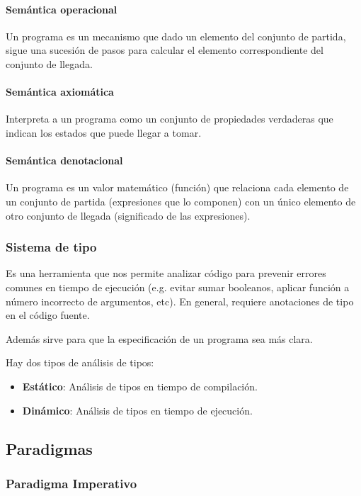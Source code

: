 \paragraph{Semántica operacional} Un programa es un mecanismo que dado un elemento del conjunto de partida, sigue una sucesión de pasos para calcular el elemento correspondiente del conjunto de llegada.

\paragraph{Semántica axiomática} Interpreta a un programa como un conjunto de propiedades verdaderas que indican los estados que puede llegar a tomar.

\paragraph{Semántica denotacional} Un programa es un valor matemático (función) que relaciona cada elemento de un conjunto de partida (expresiones que lo componen) con un único elemento de otro conjunto de llegada (significado de las expresiones).

\subsubsection{Sistema de tipo}
Es una herramienta que nos permite analizar código para prevenir errores comunes en tiempo de ejecución (e.g. evitar sumar booleanos, aplicar función a número incorrecto de argumentos, etc). En general, requiere anotaciones de tipo en el código fuente. 

Además sirve para que la especificación de un programa sea más clara.

Hay dos tipos de análisis de tipos:
\begin{itemize}
	\item \textbf{Estático}: Análisis de tipos en tiempo de compilación.
	\item \textbf{Dinámico}: Análisis de tipos en tiempo de ejecución.
\end{itemize}

\subsection{Paradigmas}
\subsubsection{Paradigma Imperativo}

